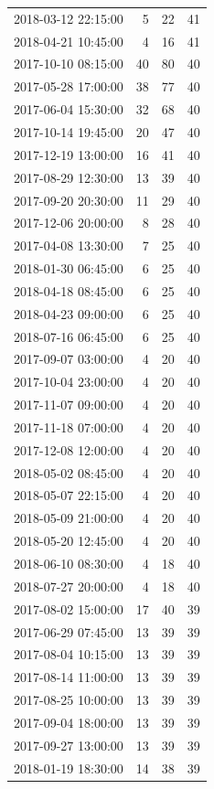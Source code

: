 \begin{tabular}{lrrr}
2018-03-12 22:15:00 & 5 & 22 & 41 \\
2018-04-21 10:45:00 & 4 & 16 & 41 \\
2017-10-10 08:15:00 & 40 & 80 & 40 \\
2017-05-28 17:00:00 & 38 & 77 & 40 \\
2017-06-04 15:30:00 & 32 & 68 & 40 \\
2017-10-14 19:45:00 & 20 & 47 & 40 \\
2017-12-19 13:00:00 & 16 & 41 & 40 \\
2017-08-29 12:30:00 & 13 & 39 & 40 \\
2017-09-20 20:30:00 & 11 & 29 & 40 \\
2017-12-06 20:00:00 & 8 & 28 & 40 \\
2017-04-08 13:30:00 & 7 & 25 & 40 \\
2018-01-30 06:45:00 & 6 & 25 & 40 \\
2018-04-18 08:45:00 & 6 & 25 & 40 \\
2018-04-23 09:00:00 & 6 & 25 & 40 \\
2018-07-16 06:45:00 & 6 & 25 & 40 \\
2017-09-07 03:00:00 & 4 & 20 & 40 \\
2017-10-04 23:00:00 & 4 & 20 & 40 \\
2017-11-07 09:00:00 & 4 & 20 & 40 \\
2017-11-18 07:00:00 & 4 & 20 & 40 \\
2017-12-08 12:00:00 & 4 & 20 & 40 \\
2018-05-02 08:45:00 & 4 & 20 & 40 \\
2018-05-07 22:15:00 & 4 & 20 & 40 \\
2018-05-09 21:00:00 & 4 & 20 & 40 \\
2018-05-20 12:45:00 & 4 & 20 & 40 \\
2018-06-10 08:30:00 & 4 & 18 & 40 \\
2018-07-27 20:00:00 & 4 & 18 & 40 \\
2017-08-02 15:00:00 & 17 & 40 & 39 \\
2017-06-29 07:45:00 & 13 & 39 & 39 \\
2017-08-04 10:15:00 & 13 & 39 & 39 \\
2017-08-14 11:00:00 & 13 & 39 & 39 \\
2017-08-25 10:00:00 & 13 & 39 & 39 \\
2017-09-04 18:00:00 & 13 & 39 & 39 \\
2017-09-27 13:00:00 & 13 & 39 & 39 \\
2018-01-19 18:30:00 & 14 & 38 & 39 \\

\end{tabular}
